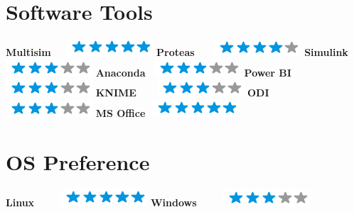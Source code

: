 \documentclass[]{friggeri-cv}
\begin{document}
\begin{aside}
  \section{Software Tools}
    \textbf{Multisim} $\>\>\>\>$ \includegraphics[scale=0.40]{img/5stars.png}
    \textbf{Proteas} $\>\>\>\>\>\>$ \includegraphics[scale=0.40]{img/4stars.png}
    \textbf{Simulink}$\>\>\>\>\>\>$ \includegraphics[scale=0.40]{img/3stars.png}
    \textbf{Anaconda}$\>\>\>\>$\includegraphics[scale=0.40]{img/3stars.png}
    \textbf{Power BI}$\>\>\>\>\>$\includegraphics[scale=0.40]{img/3stars.png}
    \textbf{KNIME}$\>\>\>\>\>\>\>\>$ \includegraphics[scale=0.40]{img/3stars.png}
    \textbf{ODI}\hspace{0.2cm} $\>\>\>\>\>\>\>\>\>\>\>\>$\includegraphics[scale=0.40]{img/3stars.png}
    \textbf{MS Office}$\>\>\>$\includegraphics[scale=0.40]{img/5stars.png}
    ~
    
  \section{OS Preference}
    \textbf{Linux}$\>\>\>\>\>\>\>\>\>\>\>\>$\includegraphics[scale=0.40]{img/5stars.png}
    \textbf{Windows}$\>\>\>\>\>\>\>\>\>\>\>\>$\includegraphics[scale=0.40]{img/3stars.png}
    ~
    
    ~
    
\end{aside}
\end{document}
